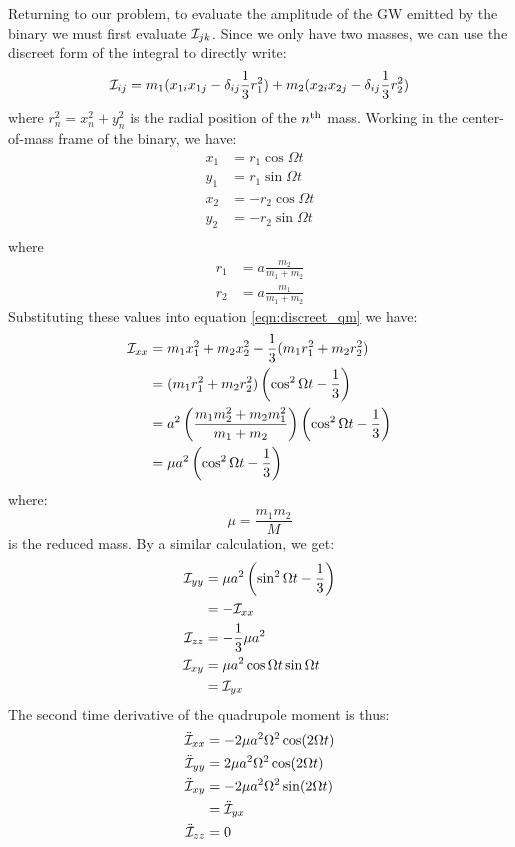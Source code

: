 Returning to our problem, to evaluate the amplitude of the \ac{GW} emitted by the binary we must first evaluate $\mathcal{I}_{jk}$. Since we only have two masses, we can use the discreet form of the integral to directly write:
\begin{equation}
\label{eqn:discreet_qm}
\qI_{ij} = m_1(x_{1i}x_{1j} - \delta_{ij}\frac{1}{3} r_1^2) + m_2(x_{2i}x_{2j} - \delta_{ij}\frac{1}{3}r_2^2)
\end{equation}
where $r_n^2 = x_n^2 + y_n^2$ is the radial position of the $n^{\mathrm{th}}$ mass. Working in the center-of-mass frame of the binary, we have:
\begin{align*}
x_1 &= r_1 \cos \Omega t \\
y_1 &= r_1 \sin \Omega t \\
x_2 &= - r_2 \cos \Omega t \\
y_2 &= - r_2 \sin \Omega t \\
\end{align*}
where
\begin{align}
r_1 &= a\frac{m_2}{m_1 + m_2} \\
r_2 &= a \frac{m_1}{m_1 + m_2}
\end{align}
Substituting these values into equation \ref{eqn:discreet_qm} we have:
\begin{align}
\mathcal{I}_{xx} &= m_1 x_1^2 + m_2 x_2^2 - \frac{1}{3}(m_1r_1^2 + m_2r_2^2) \nonumber \\
         &= (m_1r_1^2 + m_2r_2^2)\left(\cos^2 \Omega t - \frac{1}{3}\right) \nonumber \\
         &= a^2\left(\frac{m_1m_2^2 + m_2m_1^2}{m_1+m_2}\right)\left(\cos^2 \Omega t - \frac{1}{3}\right) \nonumber \\
         &= \mu a^2 \left(\cos^2 \Omega t - \frac{1}{3} \right)
\end{align}
where:
\begin{equation}
\label{eqn:reduced_mass}
\mu = \frac{m_1 m_2}{M}
\end{equation}
is the reduced mass. By a similar calculation, we get:
\begin{align}
\mathcal{I}_{yy} &= \mu a^2 \left(\sin^2 \Omega t - \frac{1}{3}\right) \\
         &= -\mathcal{I}_{xx} \\
\mathcal{I}_{zz} &= -\frac{1}{3} \mu a^2 \\
\mathcal{I}_{xy} &= \mu a^2 \cos \Omega t \sin \Omega t \\
         &= \mathcal{I}_{yx}
\end{align}
The second time derivative of the quadrupole moment is thus:
\begin{subequations}
\begin{align}
\ddot{\mathcal{I}}_{xx} &=  -2\mu a^2\Omega^2 \cos(2\Omega t) \\
\ddot{\mathcal{I}}_{yy} &=  2\mu a^2\Omega^2 \cos(2\Omega t)  \\
\ddot{\mathcal{I}}_{xy} &=  -2 \mu a^2 \Omega^2 \sin(2 \Omega t) \\
                &=  \ddot{\mathcal{I}}_{yx} \\
\ddot{\mathcal{I}}_{zz} &=  0
\end{align}
\label{eqn:second_deriv_qm}
\end{subequations}

